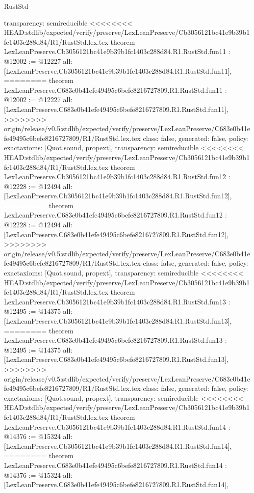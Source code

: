 \begin{lexlean}{RustStd}
\begin{coremodule}
{\begin{coremodule}
{{{{{{{{{{{{{{  transparency: semireducible
}
<<<<<<<< HEAD:stdlib/expected/verify/preserve/LexLeanPreserve/Cb3056121bc41e9b39b1fc1403c288d84/R1/RustStd.lex.tex
theorem LexLeanPreserve.Cb3056121bc41e9b39b1fc1403c288d84.R1.RustStd.fun11 : @12002 := @12227 {
  all: [LexLeanPreserve.Cb3056121bc41e9b39b1fc1403c288d84.R1.RustStd.fun11],
========
theorem LexLeanPreserve.C683e0b41efe49495c6befe8216727809.R1.RustStd.fun11 : @12002 := @12227 {
  all: [LexLeanPreserve.C683e0b41efe49495c6befe8216727809.R1.RustStd.fun11],
>>>>>>>> origin/release/v0.5:stdlib/expected/verify/preserve/LexLeanPreserve/C683e0b41efe49495c6befe8216727809/R1/RustStd.lex.tex
  class: false,
  generated: false,
  policy: exact{axioms: [Quot.sound, propext]},
  transparency: semireducible
}
<<<<<<<< HEAD:stdlib/expected/verify/preserve/LexLeanPreserve/Cb3056121bc41e9b39b1fc1403c288d84/R1/RustStd.lex.tex
theorem LexLeanPreserve.Cb3056121bc41e9b39b1fc1403c288d84.R1.RustStd.fun12 : @12228 := @12494 {
  all: [LexLeanPreserve.Cb3056121bc41e9b39b1fc1403c288d84.R1.RustStd.fun12],
========
theorem LexLeanPreserve.C683e0b41efe49495c6befe8216727809.R1.RustStd.fun12 : @12228 := @12494 {
  all: [LexLeanPreserve.C683e0b41efe49495c6befe8216727809.R1.RustStd.fun12],
>>>>>>>> origin/release/v0.5:stdlib/expected/verify/preserve/LexLeanPreserve/C683e0b41efe49495c6befe8216727809/R1/RustStd.lex.tex
  class: false,
  generated: false,
  policy: exact{axioms: [Quot.sound, propext]},
  transparency: semireducible
}
<<<<<<<< HEAD:stdlib/expected/verify/preserve/LexLeanPreserve/Cb3056121bc41e9b39b1fc1403c288d84/R1/RustStd.lex.tex
theorem LexLeanPreserve.Cb3056121bc41e9b39b1fc1403c288d84.R1.RustStd.fun13 : @12495 := @14375 {
  all: [LexLeanPreserve.Cb3056121bc41e9b39b1fc1403c288d84.R1.RustStd.fun13],
========
theorem LexLeanPreserve.C683e0b41efe49495c6befe8216727809.R1.RustStd.fun13 : @12495 := @14375 {
  all: [LexLeanPreserve.C683e0b41efe49495c6befe8216727809.R1.RustStd.fun13],
>>>>>>>> origin/release/v0.5:stdlib/expected/verify/preserve/LexLeanPreserve/C683e0b41efe49495c6befe8216727809/R1/RustStd.lex.tex
  class: false,
  generated: false,
  policy: exact{axioms: [Quot.sound, propext]},
  transparency: semireducible
}
<<<<<<<< HEAD:stdlib/expected/verify/preserve/LexLeanPreserve/Cb3056121bc41e9b39b1fc1403c288d84/R1/RustStd.lex.tex
theorem LexLeanPreserve.Cb3056121bc41e9b39b1fc1403c288d84.R1.RustStd.fun14 : @14376 := @15324 {
  all: [LexLeanPreserve.Cb3056121bc41e9b39b1fc1403c288d84.R1.RustStd.fun14],
========
theorem LexLeanPreserve.C683e0b41efe49495c6befe8216727809.R1.RustStd.fun14 : @14376 := @15324 {
  all: [LexLeanPreserve.C683e0b41efe49495c6befe8216727809.R1.RustStd.fun14],
}}}}}}}}}}}}}}}}}}
\end{coremodule}}
\end{coremodule}
\end{lexlean}
